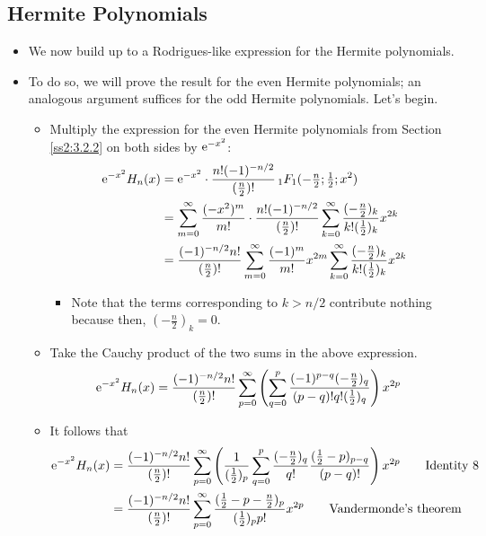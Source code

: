 \documentclass[../finalProject.tex]{subfiles}
\begin{document}
\subsection{Hermite Polynomials}\label{sss:9.4}
\begin{itemize}
    \item We now build up to a Rodrigues-like expression for the Hermite polynomials.
    \item To do so, we will prove the result for the even Hermite polynomials; an analogous argument suffices for the odd Hermite polynomials. Let's begin.
    \begin{itemize}
        \item Multiply the expression for the even Hermite polynomials from Section \ref{ss2:3.2.2} on both sides by $\e[-x^2]$:
        \begin{align*}
            \e[-x^2]H_n(x) &= \e[-x^2]\cdot\frac{n!(-1)^{-n/2}}{(\tfrac{n}{2})!}\,{}_1F_1(-\tfrac{n}{2};\tfrac{1}{2};x^2)\\
            &= \sum_{m=0}^\infty\frac{(-x^2)^m}{m!}\cdot\frac{n!(-1)^{-n/2}}{(\tfrac{n}{2})!}\sum_{k=0}^\infty\frac{(-\tfrac{n}{2})_k}{k!(\tfrac{1}{2})_k}x^{2k}\\
            &= \frac{(-1)^{-n/2}n!}{(\tfrac{n}{2})!}\sum_{m=0}^\infty\frac{(-1)^m}{m!}x^{2m}\sum_{k=0}^\infty\frac{(-\tfrac{n}{2})_k}{k!(\tfrac{1}{2})_k}x^{2k}
        \end{align*}
        \begin{itemize}
            \item Note that the terms corresponding to $k>n/2$ contribute nothing because then, $(-\tfrac{n}{2})_k=0$.
        \end{itemize}
        \item Take the Cauchy product of the two sums in the above expression.
        \begin{align*}
            \e[-x^2]H_n(x) &= \frac{(-1)^{-n/2}n!}{(\tfrac{n}{2})!}\sum_{p=0}^\infty\left( \sum_{q=0}^p\frac{(-1)^{p-q}(-\tfrac{n}{2})_q}{(p-q)!q!(\tfrac{1}{2})_q} \right)x^{2p}
        \end{align*}
        \item It follows that
        \begin{align*}
            \e[-x^2]H_n(x) &= \frac{(-1)^{-n/2}n!}{(\tfrac{n}{2})!}\sum_{p=0}^\infty\left( \frac{1}{(\tfrac{1}{2})_p}\sum_{q=0}^p\frac{(-\tfrac{n}{2})_q}{q!}\frac{(\tfrac{1}{2}-p)_{p-q}}{(p-q)!} \right)x^{2p}\tag*{Identity 8}\\
            &= \frac{(-1)^{-n/2}n!}{(\tfrac{n}{2})!}\sum_{p=0}^\infty\frac{(\tfrac{1}{2}-p-\tfrac{n}{2})_p}{(\tfrac{1}{2})_pp!}x^{2p}\tag*{Vandermonde's theorem}\\

\end{align*}
\end{itemize}
\end{itemize}
\end{document}
